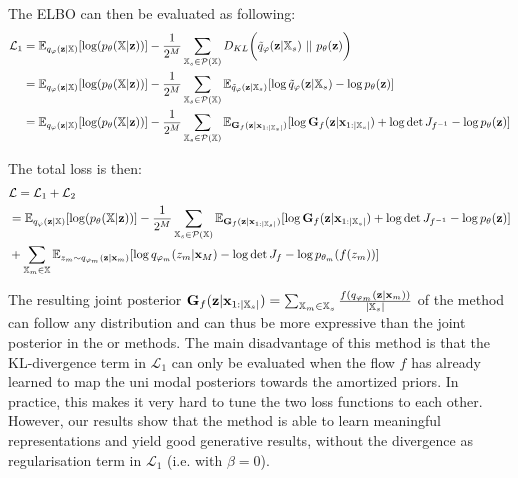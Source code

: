 The ELBO can then be evaluated as following:
\begin{equation}
    \begin{split}
        \mathcal{L}_1 &=  \mathbb{E}_{q_{\phi}(\textbf{z}|\mathbb{X})}[\log (p_{\theta}(\mathbb{X}|\textbf{z}))] -  \frac{1}{2^M} \sum _{\mathbb{X}_s \in \mathcal{P}(\mathbb{X})} D_{KL}\biggl( \tilde{q}_{\phi}(\textbf{z}|\mathbb{X}_s)\ ||\ p_{\theta}(\textbf{z})\biggr)\\
        &= \mathbb{E}_{q_{\phi}(\textbf{z}|\mathbb{X})}[\log (p_{\theta}(\mathbb{X}|\textbf{z}))] - \frac{1}{2^M} \sum _{\mathbb{X}_s \in \mathcal{P}(\mathbb{X})} \mathbb{E}_{\tilde{q}_{\phi}(\textbf{z}|\mathbb{X}_s)}[\log \tilde{q}_{\phi}(\textbf{z}|\mathbb{X}_s) - \log p_{\theta}(\textbf{z}) ]\\
        &= \mathbb{E}_{q_{\phi}(\textbf{z}|\mathbb{X})}[\log (p_{\theta}(\mathbb{X}|\textbf{z}))] - \frac{1}{2^M} \sum _{\mathbb{X}_s \in \mathcal{P}(\mathbb{X})} \mathbb{E}_{\textbf{G}_f(\textbf{z}|\textbf{x}_{1:|\xsubset|})}[\log \textbf{G}_f(\textbf{z}|\textbf{x}_{1:|\xsubset|}) + \log \det J_{f^{-1}}- \log p_{\theta}(\textbf{z}) ]
    \end{split}
\end{equation}

The total loss is then:
\begin{equation}
    \begin{split}
        &\mathcal{L} = \mathcal{L}_1 + \mathcal{L}_2\\
        &= \mathbb{E}_{q_{\varphi}(\textbf{z}|\mathbb{X})}[\log (p_{\theta}(\mathbb{X}|\textbf{z}))] - \frac{1}{2^M} \sum _{\mathbb{X}_s \in \mathcal{P}(\mathbb{X})} \mathbb{E}_{\textbf{G}_f(\textbf{z}|\textbf{x}_{1:|\mathbb{X}_s|})}[\log \textbf{G}_f(\textbf{z}|\textbf{x}_{1:|\mathbb{X}_s|}) + \log \det J_{f^{-1}}- \log p_{\theta}(\textbf{z}) ]\\
        &+ \sum _{\mathbb{X}_m \in \mathbb{X}} \mathbb{E}_{z_m \sim q_{\varphi_m}(\textbf{z}|\textbf{x}_m)} [\log q_{\varphi_m}(z_m|\textbf{x}_M) - \log \det J_f  - \log p_{\theta_m}(f(z_m))]
    \end{split}
\end{equation}

The resulting joint posterior $\textbf{G}_f(\textbf{z}|\textbf{x}_{1:|\mathbb{X}_s|}) =\sum _{\mathbb{X}_m \in \mathbb{X}_s} \frac{f(q_{\varphi_m}(\textbf{z}|\textbf{x}_m))}{|\mathbb{X}_s|}$ of the  method can follow any distribution and can thus be more expressive than the joint posterior in the  or  methods.
The main disadvantage of this method is that the KL-divergence term in $\mathcal{L}_1$ can only be evaluated when the flow $f$ has already learned to map the uni modal posteriors towards the amortized priors.
In practice, this makes it very hard to tune the two loss functions to each other.
However, our results show that the  method is able to learn meaningful representations and yield good generative results, without the divergence as regularisation term in $\mathcal{L}_1$ (i.e. with $\beta = 0$).


